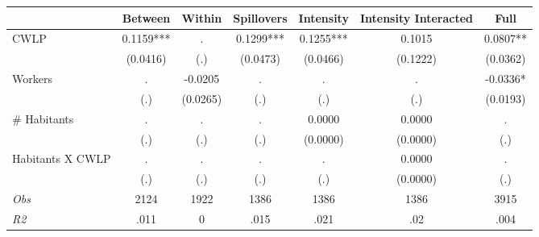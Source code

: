\begin{tabular}{l*{6}{c}}\hline&\multicolumn{1}{c}{Between}&\multicolumn{1}{c}{Within}&\multicolumn{1}{c}{Spillovers}&\multicolumn{1}{c}{Intensity}&\multicolumn{1}{c}{Intensity Interacted}&\multicolumn{1}{c}{Full}\\ \hline 
CWLP & 0.1159*** & . & 0.1299*** & 0.1255*** & 0.1015 & 0.0807** \\
 & (0.0416) & (.) & (0.0473) & (0.0466) & (0.1222) & (0.0362) \\
Workers & . & -0.0205 & . & . & . & -0.0336* \\
 & (.) & (0.0265) & (.) & (.) & (.) & (0.0193) \\
\# Habitants & . & . & . & 0.0000 & 0.0000 & . \\
 & (.) & (.) & (.) & (0.0000) & (0.0000) & (.) \\
Habitants X CWLP & . & . & . & . & 0.0000 & . \\
 & (.) & (.) & (.) & (.) & (0.0000) & (.) \\
\hline \textit{Obs} & 2124 & 1922 & 1386 & 1386 & 1386 & 3915 \\ \textit{R2} & .011 & 0 & .015 & .021 & .02 & .004 \\ \hline \end{tabular}
